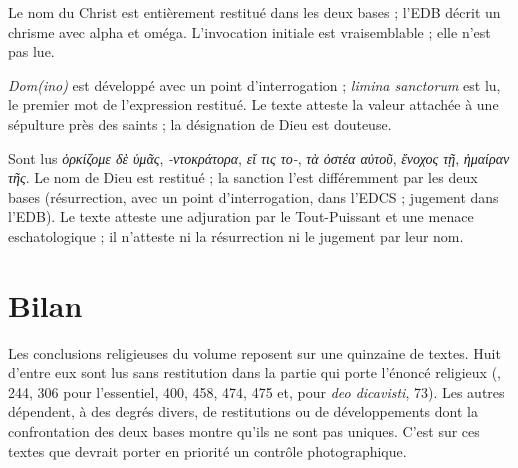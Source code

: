 \begin{description}[style=nextline,leftmargin=1.5em,font=\normalfont\bfseries]
\item[\nnum{43} (355) — \emph{In nomine [Christi]} (p.~\pageref{dos:43})] Le nom du Christ est entièrement restitué dans les deux bases ; l’EDB décrit un chrisme avec alpha et oméga. L’invocation initiale est vraisemblable ; elle n’est pas lue.
\item[\nnum{232} (382) — \emph{in dom(ino?) cultrix}, \emph{limina sanctorum} (p.~\pageref{dos:232})] \emph{Dom(ino)} est développé avec un point d’interrogation ; \emph{limina sanctorum} est lu, le premier mot de l’expression restitué. Le texte atteste la valeur attachée à une sépulture près des saints ; la désignation de Dieu est douteuse.
\item[\nnum{447} (401) — imprécation grecque (p.~\pageref{dos:447})] Sont lus \emph{ὁρκίζομε δὲ ὑμᾶς}, \emph{-ντοκράτορα}, \emph{εἴ τις το-}, \emph{τὰ ὀστέα αὐτοῦ}, \emph{ἔνοχος τῇ}, \emph{ἡμαίραν τῆς}. Le nom de Dieu est restitué ; la sanction l’est différemment par les deux bases (résurrection, avec un point d’interrogation, dans l’EDCS ; jugement dans l’EDB). Le texte atteste une adjuration par le Tout-Puissant et une menace eschatologique ; il n’atteste ni la résurrection ni le jugement par leur nom.
\end{description}

\section{Bilan}

Les conclusions religieuses du volume reposent sur une quinzaine de textes. Huit d’entre eux sont lus sans restitution dans la partie qui porte l’énoncé religieux (, 244, 306 pour l’essentiel, 400, 458, 474, 475 et, pour \emph{deo dicavisti}, 73). Les autres dépendent, à des degrés divers, de restitutions ou de développements dont la confrontation des deux bases montre qu’ils ne sont pas uniques. C’est sur ces textes que devrait porter en priorité un contrôle photographique.
